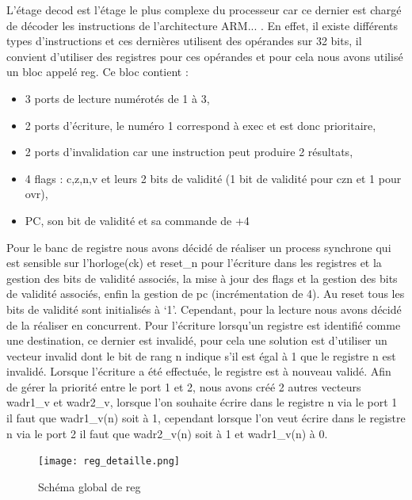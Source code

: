 \documentclass[10pt,a4paper]{article}
\begin{document}
			L'étage decod est l'étage le plus complexe du processeur car ce dernier est chargé de décoder les 
			instructions de l'architecture ARM... . En effet, il existe différents types d'instructions et ces 
			dernières utilisent des opérandes sur 32 bits, il convient d'utiliser des registres pour ces 
			opérandes et pour cela nous avons utilisé un bloc appelé reg. Ce bloc contient :
			
			\begin{itemize}															%
				\item 3 ports de lecture numérotés de 1 à 3,
				\item 2 ports d’écriture, le numéro 1 correspond à exec et est donc prioritaire,
				\item 2 ports d’invalidation car une instruction peut produire 2 résultats,
				\item 4 flags : c,z,n,v et leurs 2 bits de validité (1 bit de validité pour czn et 1 pour ovr),
				\item PC, son bit de validité et sa commande de +4
			\end{itemize}
			
			Pour le banc de registre nous avons décidé de réaliser un process synchrone qui est sensible sur 
			l'horloge(ck) et reset\_n pour l'écriture dans les registres et la gestion des bits de validité 
			associés, la mise à jour des flags et la gestion des bits de validité associés, enfin la gestion de 
			pc (incrémentation de 4). Au reset tous les bits de validité sont initialisés à ‘1’. Cependant, 
			pour la lecture nous avons décidé de la réaliser en concurrent. Pour l'écriture lorsqu'un registre 
			est identifié comme une destination, ce dernier est invalidé, pour cela une solution est d'utiliser 
			un vecteur invalid dont le bit de rang n indique s'il est égal à 1 que le registre n est invalidé. 
			Lorsque l'écriture a été effectuée, le registre est à nouveau validé. Afin de gérer la priorité 
			entre le port 1 et 2, nous avons créé 2 autres vecteurs wadr1\_v et wadr2\_v, lorsque l'on souhaite 
			écrire dans le registre n via le port 1 il faut que wadr1\_v(n) soit à 1, cependant lorsque l'on 
			veut écrire dans le registre n via le port 2 il faut que wadr2\_v(n) soit à 1 et wadr1\_v(n) à 0. 
			
			\begin{figure}[H]															%
				\centering 																%
				\texttt{[image: reg\_detaille.png]} 				%
				\caption{Schéma global de reg}											%
				\label{Fig.main2} 														%
			\end{figure}
\end{document}
